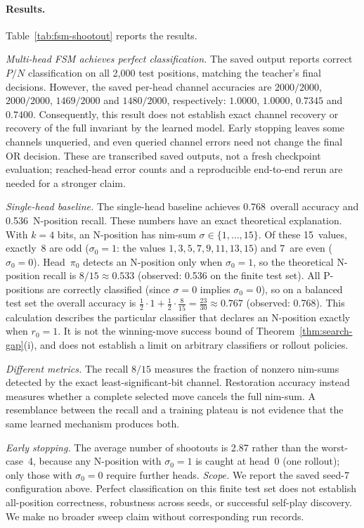 \documentclass[11pt]{article}
\theoremstyle{plain}
\theoremstyle{definition}
\theoremstyle{remark}
\numberwithin{equation}{section}
\begin{document}
\paragraph{Results.}
Table~\ref{tab:fsm-shootout} reports the results.

\emph{Multi-head FSM achieves perfect classification.}
The saved output reports correct $P/N$ classification on all 2,000 test positions, matching the teacher's final decisions. However, the saved per-head channel accuracies are $2000/2000$, $2000/2000$, $1469/2000$ and $1480/2000$, respectively: $1.0000$, $1.0000$, $0.7345$ and $0.7400$.
Consequently, this result does not establish exact channel recovery or recovery of the full invariant by the learned model. Early stopping leaves some channels unqueried, and even queried channel errors need not change the final OR decision. These are transcribed saved outputs, not a fresh checkpoint evaluation; reached-head error counts and a reproducible end-to-end rerun are needed for a stronger claim.

\emph{Single-head baseline.}
The single-head baseline achieves 0.768~overall accuracy and 0.536~N-position recall. These numbers have an exact theoretical explanation. With $k=4$ bits, an N-position has nim-sum $\sigma \in \{1,\dots,15\}$.
Of these 15~values, exactly~8 are odd ($\sigma_0 = 1$: the values $1,3,5,7,9,11,13,15$) and 7~are even ($\sigma_0 = 0$).
Head~$\pi_0$ detects an N-position only when $\sigma_0 = 1$, so the theoretical N-position recall is $8/15 \approx 0.533$ (observed: 0.536 on the finite test set). All P-positions are correctly classified (since $\sigma = 0$ implies $\sigma_0 = 0$), so on a balanced test set the overall accuracy is
$\tfrac{1}{2}\cdot 1 + \tfrac{1}{2}\cdot\tfrac{8}{15} = \tfrac{23}{30} \approx 0.767$
(observed: 0.768).
This calculation describes the particular classifier that declares an N-position exactly when $r_0=1$. It is not the winning-move success bound of Theorem~\ref{thm:search-gap}(i), and does not establish a limit on arbitrary classifiers or rollout policies.

\emph{Different metrics.}
The recall $8/15$ measures the fraction of nonzero nim-sums detected by the exact least-significant-bit channel. Restoration accuracy instead measures whether a complete selected move cancels the full nim-sum. A resemblance between the recall and a training plateau is not evidence that the same learned mechanism produces both.

\emph{Early stopping.}
The average number of shootouts is 2.87 rather than the worst-case~4, because any N-position with $\sigma_0 = 1$ is caught at head~0 (one rollout); only those with $\sigma_0 = 0$ require further heads.
\emph{Scope.}
We report the saved seed-7 configuration above. Perfect classification on this finite test set does not establish all-position correctness, robustness across seeds, or successful self-play discovery. We make no broader sweep claim without corresponding run records.
\end{document}

